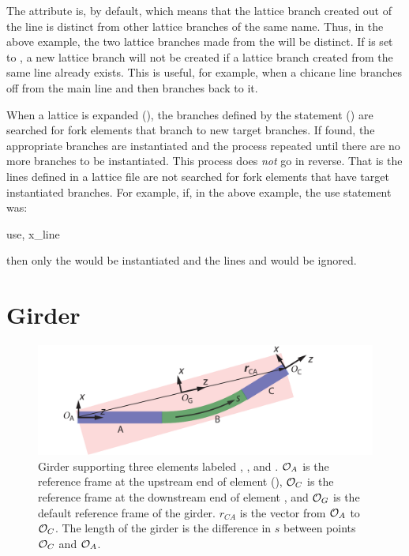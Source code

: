 The  attribute is, by default,  which means
that the lattice branch created out of the  line is
distinct from other lattice branches of the same name. Thus, in the
above example, the two lattice branches made from the  will
be distinct. If  is set to , a new lattice
branch will not be created if a lattice branch created from the same
line already exists. This is useful, for example, when a chicane line
branches off from the main line and then branches back to it.

When a lattice is expanded (), the branches defined by
the  statement () are searched for fork elements
that branch to new target branches. If found, the appropriate branches are
instantiated and the process repeated until there are no more branches
to be instantiated. This process does {\em not} go in reverse. That is
the lines defined in a lattice file are not searched for fork elements
that have target instantiated branches. For example, if, in the above example,
the use statement was:
\begin{example}
  use, x_line
\end{example}
then only the  would be instantiated and the lines  and
 would be ignored.

\section{Girder}
\label{s:girder}

\begin{figure}[t]
  \centering
  \includegraphics{girder.pdf}
  \caption[Girder example.] {
Girder supporting three elements labeled , , and .
${\cal O}_A$ is the reference frame at the upstream end of element 
(), ${\cal O}_C$ is the reference frame at the
downstream end of element , and ${\cal O}_G$ is the default
 reference frame of the girder. $r_{CA}$ is the vector from
${\cal O}_A$ to ${\cal O}_C$. The length  of the girder is the
difference in $s$ between points ${\cal O}_C$ and ${\cal O}_A$.
  }
  \label{f:girder}
\end{figure}

